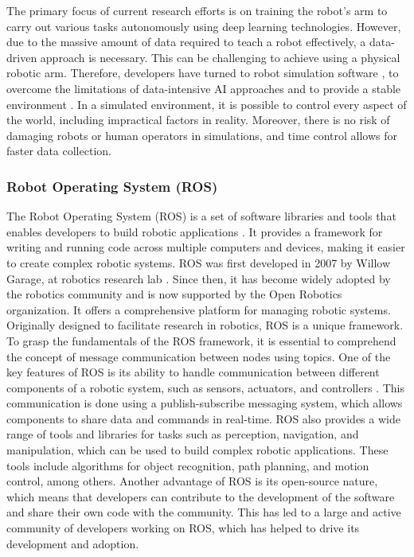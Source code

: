 \documentclass[12pt,oneside]{article}
\begin{document}
The primary focus of current research efforts is on training the robot’s arm to carry out various tasks autonomously using deep learning technologies. However, due to the massive amount of data required to teach a robot effectively, a data-driven approach is necessary. This can be challenging to achieve using a physical robotic arm. Therefore, developers have turned to robot simulation software \cite{12_oRobotics}, \cite{13_pybullet} to overcome the limitations of data-intensive AI approaches and to provide a stable environment \cite{14_banks1999introduction}. In a simulated environment, it is possible to control every aspect of the world, including impractical factors in reality. Moreover, there is no risk of damaging robots or human operators in simulations, and time control allows for faster data collection.

\subsubsection{Robot Operating System (ROS)}
The Robot Operating System (ROS) is a set of software libraries and tools that enables developers to build robotic applications \cite{15_quigley2009ros}. It provides a framework for writing and running code across multiple computers and devices, making it easier to create complex robotic systems. ROS was first developed in 2007 by Willow Garage, at robotics research lab \cite{16_cousins2014willow}. Since then, it has become widely adopted by the robotics community and is now supported by the Open Robotics organization. It offers a comprehensive platform for managing robotic systems. Originally designed to facilitate research in robotics, ROS is a unique framework. To grasp the fundamentals of the ROS framework, it is essential to comprehend the concept of message communication between nodes using topics.
One of the key features of ROS is its ability to handle communication between different components of a robotic system, such as sensors, actuators, and controllers \cite{17_emmi2014new}. This communication is done using a publish-subscribe messaging system, which allows components to share data and commands in real-time. ROS also provides a wide range of tools and libraries for tasks such as perception, navigation, and manipulation, which can be used to build complex robotic applications. These tools include algorithms for object recognition, path planning, and motion control, among others. Another advantage of ROS is its open-source nature, which means that developers can contribute to the development of the software and share their own code with the community. This has led to a large and active community of developers working on ROS, which has helped to drive its development and adoption.
\end{document}
